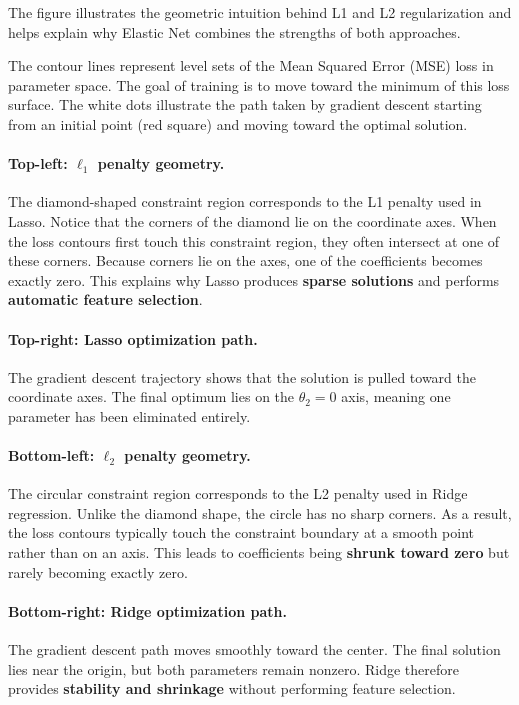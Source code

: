 \documentclass{article}
\begin{document}
The figure illustrates the geometric intuition behind L1 and L2 regularization and helps explain why Elastic Net combines the strengths of both approaches.

The contour lines represent level sets of the Mean Squared Error (MSE) loss in parameter space. The goal of training is to move toward the minimum of this loss surface. The white dots illustrate the path taken by gradient descent starting from an initial point (red square) and moving toward the optimal solution.

\paragraph{Top-left: $\ell_1$ penalty geometry.}
The diamond-shaped constraint region corresponds to the L1 penalty used in Lasso. Notice that the corners of the diamond lie on the coordinate axes. When the loss contours first touch this constraint region, they often intersect at one of these corners. Because corners lie on the axes, one of the coefficients becomes exactly zero. This explains why Lasso produces \textbf{sparse solutions} and performs \textbf{automatic feature selection}.

\paragraph{Top-right: Lasso optimization path.}
The gradient descent trajectory shows that the solution is pulled toward the coordinate axes. The final optimum lies on the $\theta_2 = 0$ axis, meaning one parameter has been eliminated entirely.

\paragraph{Bottom-left: $\ell_2$ penalty geometry.}
The circular constraint region corresponds to the L2 penalty used in Ridge regression. Unlike the diamond shape, the circle has no sharp corners. As a result, the loss contours typically touch the constraint boundary at a smooth point rather than on an axis. This leads to coefficients being \textbf{shrunk toward zero} but rarely becoming exactly zero.

\paragraph{Bottom-right: Ridge optimization path.}
The gradient descent path moves smoothly toward the center. The final solution lies near the origin, but both parameters remain nonzero. Ridge therefore provides \textbf{stability and shrinkage} without performing feature selection.
\end{document}
